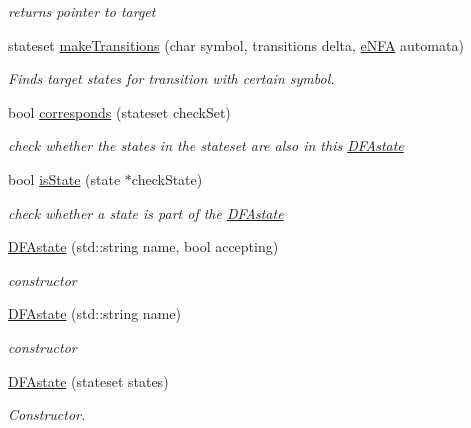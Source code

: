 \begin{DoxyCompactItemize}
\begin{DoxyCompactList}\small\item\em returns pointer to target \end{DoxyCompactList}\item 
stateset \hyperlink{structFA_1_1DFAstate_a312fac557966742eea52d0d702671901}{make\-Transitions} (char symbol, transitions delta, \hyperlink{classFA_1_1eNFA}{e\-N\-F\-A} automata)
\begin{DoxyCompactList}\small\item\em Finds target states for transition with certain symbol. \end{DoxyCompactList}\item 
bool \hyperlink{structFA_1_1DFAstate_a2a6bf513ff2806f450f1d7b97d6f1f74}{corresponds} (stateset check\-Set)
\begin{DoxyCompactList}\small\item\em check whether the states in the stateset are also in this \hyperlink{structFA_1_1DFAstate}{D\-F\-Astate} \end{DoxyCompactList}\item 
bool \hyperlink{structFA_1_1DFAstate_ad8ad9a3198ba5015535f0922b068007d}{is\-State} (state $\ast$check\-State)
\begin{DoxyCompactList}\small\item\em check whether a state is part of the \hyperlink{structFA_1_1DFAstate}{D\-F\-Astate} \end{DoxyCompactList}\item 
\hyperlink{structFA_1_1DFAstate_a3c788d56f73a70d1b5e26b25f5f532b9}{D\-F\-Astate} (std\-::string name, bool accepting)
\begin{DoxyCompactList}\small\item\em constructor \end{DoxyCompactList}\item 
\hyperlink{structFA_1_1DFAstate_a9eae2258c22336a90883229404c2f766}{D\-F\-Astate} (std\-::string name)
\begin{DoxyCompactList}\small\item\em constructor \end{DoxyCompactList}\item 
\hyperlink{structFA_1_1DFAstate_ae2b299d91adb25782fc6b9a66e982077}{D\-F\-Astate} (stateset states)
\begin{DoxyCompactList}\small\item\em Constructor. \end{DoxyCompactList}\end{DoxyCompactItemize}
